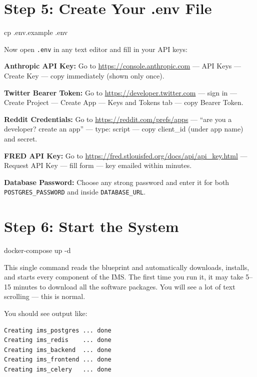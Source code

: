\documentclass[12pt, a4paper]{report}
\begin{document}
\section{Step 5: Create Your .env File}

\begin{termbox}
cp .env.example .env
\end{termbox}

Now open \texttt{.env} in any text editor and fill in your API keys:

\textbf{Anthropic API Key:} Go to \url{https://console.anthropic.com} --- API Keys --- Create Key --- copy immediately (shown only once).

\textbf{Twitter Bearer Token:} Go to \url{https://developer.twitter.com} --- sign in --- Create Project --- Create App --- Keys and Tokens tab --- copy Bearer Token.

\textbf{Reddit Credentials:} Go to \url{https://reddit.com/prefs/apps} --- ``are you a developer? create an app'' --- type: script --- copy client\_id (under app name) and secret.

\textbf{FRED API Key:} Go to \url{https://fred.stlouisfed.org/docs/api/api_key.html} --- Request API Key --- fill form --- key emailed within minutes.

\textbf{Database Password:} Choose any strong password and enter it for both \texttt{POSTGRES\_PASSWORD} and inside \texttt{DATABASE\_URL}.

\section{Step 6: Start the System}

\begin{termbox}
docker-compose up -d
\end{termbox}

This single command reads the blueprint and automatically downloads, installs, and starts every component of the IMS. The first time you run it, it may take 5--15 minutes to download all the software packages. You will see a lot of text scrolling --- this is normal.

\begin{successbox}
You should see output like:
\begin{verbatim}
Creating ims_postgres ... done
Creating ims_redis    ... done
Creating ims_backend  ... done
Creating ims_frontend ... done
Creating ims_celery   ... done
\end{verbatim}
\end{successbox}
\end{document}
